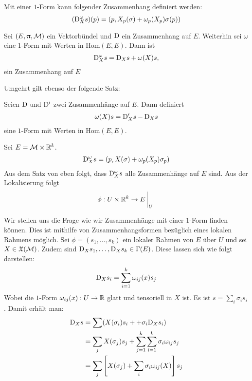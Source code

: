\begin{defs}
Mit einer $1$-Form kann folgender Zusammenhang definiert werden:
\begin{align}
(\mathrm{D}^\omega_X s)(p) = (p, X_p(\sigma) + \omega_p(X_p) \sigma(p))
\end{align}
\end{defs}

\begin{satz}
\label{satz:zusammenhangausform}
Sei $(E, \uppi, \mathcal{M})$ ein Vektorbündel und $\mathrm{D}$ ein Zusammenhang auf $E$.
Weiterhin sei $\omega$ eine $1$-Form mit Werten in $\mathrm{Hom}(E, E)$.
Dann ist 
\begin{align}
\mathrm{D}^\omega_X s = \mathrm{D}_X s + \omega(X) s,
\end{align}
ein Zusammenhang auf $E$
\end{satz}
Umgehrt gilt ebenso der folgende Satz:
\begin{satz}
Seien $\mathrm{D}$ und $\mathrm{D}'$ zwei Zusammenhänge auf $E$.
Dann definiert 
\begin{align}
\omega(X) s = \mathrm{D}'_X s - \mathrm{D}_X s
\end{align}
eine $1$-Form mit Werten in $\mathrm{Hom}(E, E)$.
\end{satz}
\begin{bsp}
Sei $E = \mathcal{M} \times \mathbb{R}^k$. 
\begin{align}
\mathrm{D}^\omega_X s = (p, X(\sigma) + \omega_p (X_p)\sigma_p)
\end{align}
Aus dem Satz von eben folgt, dass $\mathrm{D}^\omega_X s$ alle Zusammenhänge auf $E$ sind.
Aus der Lokalisierung folgt
\begin{align}
\phi : U \times \R^k \to E\eval_U.
\end{align}
\end{bsp}
Wir stellen uns die Frage wie wir Zusammenhänge mit einer $1$-Form finden können.
Dies ist mithilfe von Zusammenhangsformen bezüglich eines lokalen Rahmens möglich.
Sei $\phi = (s_1, \dots, s_k)$ ein lokaler Rahmen von $E$ über $U$ und sei $X \in \mathfrak{X}(\mathcal{M})$.
Zudem sind $\mathrm{D}_X s_1, \dots, \mathrm{D}_X s_k \in \Gamma(E)$.
Diese lassen sich wie folgt darstellen:
\begin{align}
\mathrm{D}_X s_i = \sum_{i=1}^k \omega_{ij}(x) s_j
\end{align}
Wobei die $1$-Form $\omega_{ij}(x): U \to \mathbb{R}$ glatt und tensoriell in $X$ ist.
Es ist $s = \sum_i \sigma_i s_i$. 
Damit erhält man:
\begin{align}
\mathrm{D}_X s &= \sum (X(\sigma_i)s_i + + \sigma_i \mathrm{D}_X s_i)\\
&= \sum_j X(\sigma_j)s_j + \sum_{j=1}^k \sum_{i=1}^k \sigma_i \omega_{ij} s_j\\
&= \sum_j \left[ X(\sigma_j) + \sum_i \sigma_i \omega_{ij}(X) \right] s_j
\end{align}


